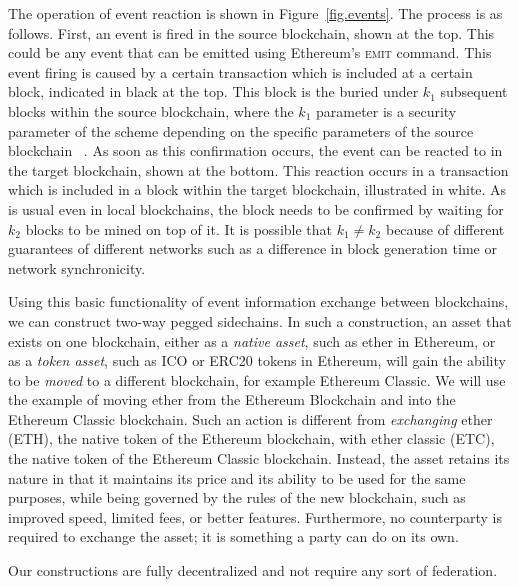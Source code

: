 The operation of event reaction is shown in Figure~\ref{fig.events}. The process
is as follows. First, an event is fired in the source blockchain, shown at the
top. This could be any event that can be emitted using Ethereum's \textsc{emit}
command. This event firing is caused by a certain transaction which is included
at a certain block, indicated in black at the top. This block is the buried
under $k_1$ subsequent blocks within the source blockchain, where the $k_1$
parameter is a security parameter of the scheme depending on the specific
parameters of the source blockchain ~\cite{EC:GarKiaLeo15}. As soon as this
confirmation occurs, the event can be reacted to in the target blockchain, shown
at the bottom. This reaction occurs in a transaction which is included in a
block within the target blockchain, illustrated in white. As is usual even in
local blockchains, the block needs to be confirmed by waiting for $k_2$ blocks
to be mined on top of it. It is possible that $k_1 \neq k_2$ because of
different guarantees of different networks such as a difference in block
generation time or network synchronicity.

Using this basic functionality of event information exchange between
blockchains, we can construct two-way pegged sidechains. In such a construction,
an asset that exists on one blockchain, either as a \emph{native asset}, such as
ether in Ethereum, or as a \emph{token asset}, such as ICO or ERC20 tokens in
Ethereum, will gain the ability to be \emph{moved} to a different blockchain,
for example Ethereum Classic. We will use the example of moving ether from the
Ethereum Blockchain and into the Ethereum Classic blockchain. Such an action is
different from \emph{exchanging} ether (ETH), the native token of the Ethereum
blockchain, with ether classic (ETC), the native token of the Ethereum Classic
blockchain. Instead, the asset retains its nature in that it maintains its price
and its ability to be used for the same purposes, while being governed by the
rules of the new blockchain, such as improved speed, limited fees, or better
features. Furthermore, no counterparty is required to exchange the asset; it is
something a party can do on its own.

Our constructions are fully decentralized and not require any sort of
federation.
